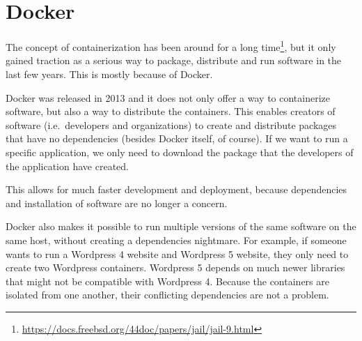 \section{Docker}\label{background:docker}
The concept of containerization has been around for a long time\footnote{\url{https://docs.freebsd.org/44doc/papers/jail/jail-9.html}}, but it only gained traction as a serious way to package, distribute and run software in the last few years. This is mostly because of Docker.

\medskip

Docker was released in 2013 and it does not only offer a way to containerize software, but also a way to distribute the containers. This enables creators of software (i.e.\ developers and organizations) to create and distribute packages that have no dependencies (besides Docker itself, of course). If we want to run a specific application, we only need to download the package that the developers of the application have created.

This allows for much faster development and deployment, because dependencies and installation of software are no longer a concern.

\medskip

Docker also makes it possible to run multiple versions of the same software on the same host, without creating a dependencies nightmare. For example, if someone wants to run a Wordpress 4 website and Wordpress 5 website, they only need to create two Wordpress containers. Wordpress 5 depends on much newer libraries that might not be compatible with Wordpress 4. Because the containers are isolated from one another, their conflicting dependencies are not a problem.









